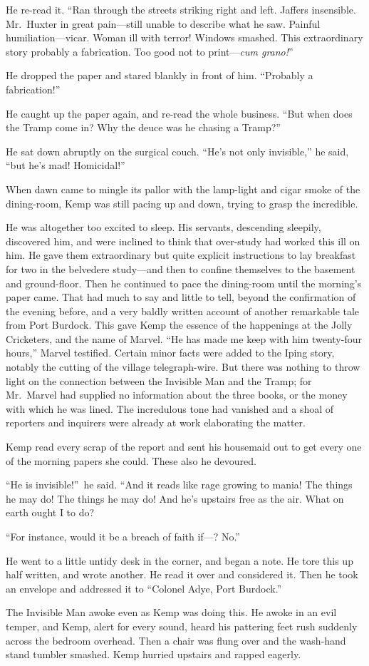 He re-read it. “Ran through the streets striking right and left. Jaffers insensible. Mr.\ Huxter in great pain—still unable to describe what he saw. Painful humiliation—vicar. Woman ill with terror! Windows smashed. This extraordinary story probably a fabrication. Too good not to print—\emph{cum grano!}”

He dropped the paper and stared blankly in front of him. “Probably a fabrication!”

He caught up the paper again, and re-read the whole business. “But when does the Tramp come in? Why the deuce was he chasing a Tramp?”

He sat down abruptly on the surgical couch. “He’s not only invisible,” he said, “but he’s mad! Homicidal!”

When dawn came to mingle its pallor with the lamp-light and cigar smoke of the dining-room, Kemp was still pacing up and down, trying to grasp the incredible.

He was altogether too excited to sleep. His servants, descending sleepily, discovered him, and were inclined to think that over-study had worked this ill on him. He gave them extraordinary but quite explicit instructions to lay breakfast for two in the belvedere study—and then to confine themselves to the basement and ground-floor. Then he continued to pace the dining-room until the morning’s paper came. That had much to say and little to tell, beyond the confirmation of the evening before, and a very baldly written account of another remarkable tale from Port Burdock. This gave Kemp the essence of the happenings at the Jolly Cricketers, and the name of Marvel. “He has made me keep with him twenty-four hours,” Marvel testified. Certain minor facts were added to the Iping story, notably the cutting of the village telegraph-wire. But there was nothing to throw light on the connection between the Invisible Man and the Tramp; for Mr.\ Marvel had supplied no information about the three books, or the money with which he was lined. The incredulous tone had vanished and a shoal of reporters and inquirers were already at work elaborating the matter.

Kemp read every scrap of the report and sent his housemaid out to get every one of the morning papers she could. These also he devoured.

“He is invisible!”\ he said. “And it reads like rage growing to mania! The things he may do! The things he may do! And he’s upstairs free as the air. What on earth ought I to do?

“For instance, would it be a breach of faith if—? No.”

He went to a little untidy desk in the corner, and began a note. He tore this up half written, and wrote another. He read it over and considered it. Then he took an envelope and addressed it to “Colonel Adye, Port Burdock.”

The Invisible Man awoke even as Kemp was doing this. He awoke in an evil temper, and Kemp, alert for every sound, heard his pattering feet rush suddenly across the bedroom overhead. Then a chair was flung over and the wash-hand stand tumbler smashed. Kemp hurried upstairs and rapped eagerly.